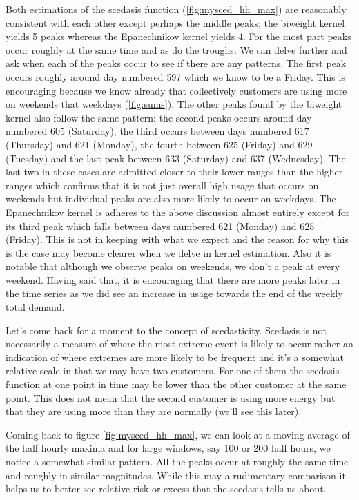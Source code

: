 \documentclass[a4paper]{article}
\begin{document}
Both estimations of the scedasis function (\ref{fig:mysced_hh_max}) are reasonably consistent with each other except perhaps the middle peaks; the biweight kernel yields 5 peaks whereas the Epanechnikov kernel yields 4. For the most part peaks occur roughly at the same time and as do the troughs. We can delve further and ask when each of the peaks occur to see if there are any patterns. The first peak occurs roughly around day numbered 597 which we know to be a Friday. This is encouraging because we know already that collectively customers are using more on weekends that weekdays (\ref{fig:sums}). The other peaks found by the biweight kernel also follow the same pattern: the second peaks occurs around day numbered 605 (Saturday), the third occurs between days numbered 617 (Thursday) and 621 (Monday), the fourth between 625 (Friday) and 629 (Tuesday) and the last peak between 633 (Saturday) and 637 (Wednesday). The last two in these cases are admitted closer to their lower ranges than the higher ranges which confirms that it is not just overall high usage that occurs on weekends but individual peaks are also more likely to occur on weekdays. The Epanechnikov kernel is adheres to the above discussion almost entirely except for its third peak which falls between days numbered 621 (Monday) and 625 (Friday). This is not in keeping with what we expect and the reason for why this is the case may become clearer when we delve in kernel estimation.
Also it is notable that although we observe peaks on weekends, we don't a peak at every weekend. Having said that, it is encouraging that there are more peaks later in the time series as we did see an increase in usage towards the end of the weekly total demand.

Let's come back for a moment to the concept of scedasticity. Scedasis is not necessarily a measure of where the most extreme event is likely to occur rather an indication of where extremes are more likely to be frequent and it's a somewhat relative scale in that we may have two customers. For one of them the scedasis function at one point in time may be lower than the other customer at the same point. This does not mean that the second customer is using more energy but that they are using more than they are normally (we'll see this later).

Coming back to figure \ref{fig:mysced_hh_max}, we can look at a moving average of the half hourly maxima and for large windows, say 100 or 200 half hours, we notice a somewhat similar pattern.  All the peaks occur at roughly the same time and roughly in similar magnitudes. While this may a rudimentary comparison it helps us to better see relative risk or excess that the scedasis tells us about.
\end{document}
